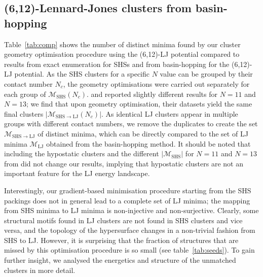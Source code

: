 \subsection{(6,12)-Lennard-Jones clusters from basin-hopping} 
\label{sec:612LennardJonesClustersfromBasinHopping}

Table~\ref{tab:comp} shows the number of distinct minima found by our cluster
geometry optimisation procedure using the (6,12)-LJ potential compared to
results from exact enumeration for \ac{SHS}s and from basin-hopping for the (6,12)-LJ
potential.  As the \ac{SHS} clusters for a specific $N$ value can be grouped by
their contact number $N_c$, the geometry optimisations were carried out
separately for each group of $\mathcal{M}_\mathrm{SHS}(N_c)$. \citeauthor{Hoy_Structurefinitesphere_2012}
\autocite{Hoy_Structurefinitesphere_2012,Hoy_Structuredynamicsmodel_2015} and \citeauthor{Holmes-Cerfon_EnumeratingRigidSphere_2016}\autocite{Holmes-Cerfon_EnumeratingRigidSphere_2016}  reported
slightly different results
for $N=11$ and $N=13$; we find that upon geometry optimisation,
their datasets yield the same final clusters
$|\mathcal{M}_{\mathrm{SHS\to LJ}}(N_c)|$.  As identical LJ clusters appear in
multiple groups with different contact numbers, we remove the duplicates to
create the set $\mathcal{M}_\mathrm{SHS\to LJ}$ of distinct minima, which can
be directly compared to the set of LJ minima $\mathcal{M}_\mathrm{LJ}$ obtained
from the basin-hopping method. It should be noted that including the hypostatic
clusters and the different $|\mathcal{M}_\mathrm{SHS}|$ for $N=11$ and $N=13$
from \citeauthor{Holmes-Cerfon_EnumeratingRigidSphere_2016}\autocite{Holmes-Cerfon_EnumeratingRigidSphere_2016} did not change our results, implying that hypostatic
clusters are not an important feature for the LJ energy landscape. 


Interestingly, our gradient-based minimisation procedure starting from the \ac{SHS}
packings does not in general lead to a complete set of LJ minima; the mapping
from \ac{SHS} minima to LJ minima is non-injective and non-surjective.  Clearly,
some structural motifs found in LJ clusters are not found in \ac{SHS} clusters and
vice versa, and the topology of the hypersurface changes in a non-trivial
fashion from \ac{SHS} to LJ.  However, it is surprising that the fraction of
structures that are missed by this optimisation procedure is so small (see
table~\ref{tab:seeds}). To gain further insight, we analysed the energetics and
structure of the unmatched clusters in more detail.


